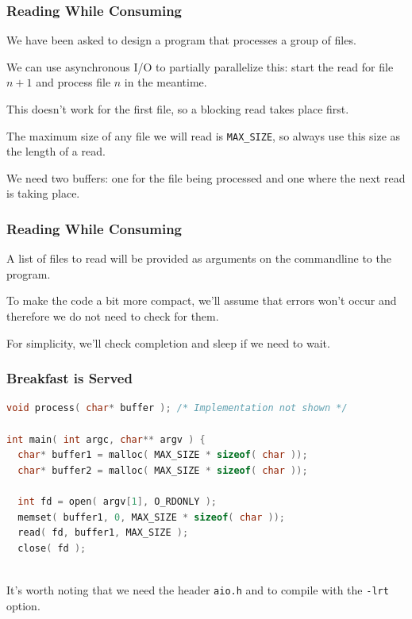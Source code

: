 \begin{frame}
	\frametitle{Reading While Consuming}

	We have been asked to design a program that processes a group of files.

	We can use asynchronous I/O to partially parallelize this: start the read for file $n+1$ and process file $n$ in the meantime.

	This doesn't work for the first file, so a blocking read takes place first.

	The maximum size of any file we will read is \texttt{MAX\_SIZE}, so always use this size as the length of a read.

	We need two buffers: one for the file being processed and one where the next read is taking place.

\end{frame}


\begin{frame}
	\frametitle{Reading While Consuming}

	A list of files to read will be provided as arguments on the commandline to the program.

	To make the code a bit more compact, we'll assume that errors won't occur and therefore we do not need to check for them.

	For simplicity, we'll check completion and sleep if we need to wait.

\end{frame}


\begin{frame}[fragile]
	\frametitle{Breakfast is Served}

	\begin{lstlisting}[language=C]
void process( char* buffer ); /* Implementation not shown */

int main( int argc, char** argv ) {
  char* buffer1 = malloc( MAX_SIZE * sizeof( char ));
  char* buffer2 = malloc( MAX_SIZE * sizeof( char ));
  
  int fd = open( argv[1], O_RDONLY );
  memset( buffer1, 0, MAX_SIZE * sizeof( char ));
  read( fd, buffer1, MAX_SIZE );
  close( fd );
  
\end{lstlisting}

	It's worth noting that we need the header \texttt{aio.h} and to compile with the \texttt{-lrt} option.


\end{frame}

